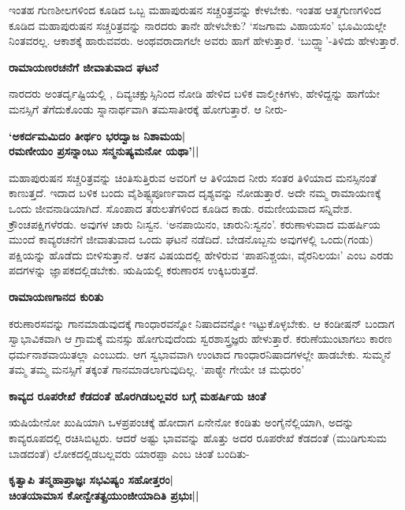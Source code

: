 ಇಂತಹ ಗುಣಶೀಲಗಳಿಂದ ಕೂಡಿದ ಒಬ್ಬ ಮಹಾಪುರುಷನ ಸಚ್ಚರಿತ್ರವನ್ನು ಕೇಳಬೇಕು. ಇಂತಹ ಆತ್ಮಗುಣಗಳಿಂದ ಕೂಡಿದ ಮಹಾಪುರುಷನ ಸಚ್ಚರಿತ್ರವನ್ನು ನಾರದರು ತಾನೇ ಹೇಳಬೇಕು? `ಸಜಗಾಮ ವಿಹಾಯಸಂ' ಭೂಮಿಯಲ್ಲೇ ನಿಂತವರಲ್ಲ. ಆಕಾಶಕ್ಕೆ ಹಾರುವವರು. ಅಂಥವರಾದಾಗಲೇ ಅವರು ಹಾಗೆ ಹೇಳುತ್ತಾರೆ. `ಬುದ್ದ್ವಾ'-ತಿಳಿದು ಹೇಳುತ್ತಾರೆ. 


{\bf ರಾಮಾಯಣರಚನೆಗೆ ಜೀವಾತುವಾದ ಘಟನೆ} 


ನಾರದರು ಅಂತರ್ದೃಷ್ಟಿಯಲ್ಲಿ , ದಿವ್ಯಚಕ್ಷುಸ್ಸಿನಿಂದ ನೋಡಿ ಹೇಳಿದ ಬಳಿಕ ವಾಲ್ಮೀಕಿಗಳು, ಹೇಳಿದ್ದನ್ನು ಹಾಗೆಯೇ ಮನಸ್ಸಿಗೆ ತೆಗೆದುಕೊಂಡು ಸ್ನಾನಾರ್ಥವಾಗಿ ತಮಸಾತೀರಕ್ಕೆ ಹೋಗುತ್ತಾರೆ. ಆ ನೀರು- 


\begin{center} 

{\bf `ಅಕರ್ದಮಮಿದಂ ತೀರ್ಥಂ ಭರದ್ವಾಜ ನಿಶಾಮಯ|\\ 

ರಮಣೀಯಂ ಪ್ರಸನ್ನಾಂಬು ಸನ್ಮನುಷ್ಯಮನೋ ಯಥಾ'||} 

\end{center} 


ಮಹಾಪುರುಷನ ಸಚ್ಚರಿತ್ರವನ್ನು ಚಿಂತಿಸುತ್ತಿರುವ ಅವರಿಗೆ ಆ ತಿಳಿಯಾದ ನೀರು ಸಂತರ ತಿಳಿಯಾದ ಮನಸ್ಸಿನಂತೆ ಕಾಣುತ್ತದೆ. ಇದಾದ ಬಳಿಕ ಬಂದು ವೈಶಿಷ್ಟ್ಯಪೂರ್ಣವಾದ ದೃಶ್ಯವನ್ನು ನೋಡುತ್ತಾರೆ. ಅದೇ ನಮ್ಮ ರಾಮಾಯಣಕ್ಕೆ ಒಂದು ಜೀವನಾಡಿಯಾಗಿದೆ. ಸೊಂಪಾದ ತರುಲತೆಗಳಿಂದ ಕೂಡಿದ ಕಾಡು. ರಮಣೀಯವಾದ ಸನ್ನಿವೇಶ. ಕ್ರೌಂಚಪಕ್ಷಿಗಳೆರಡು. ಅವುಗಳ ಚಾರು ನಿಃಸ್ವನ. `ಅನಪಾಯಿನಂ, ಚಾರುನಿ:ಸ್ವನಂ'. ಕರುಣಾಳುವಾದ ಮಹರ್ಷಿಯ ಮುಂದೆ ಕಾವ್ಯರಚನೆಗೆ ಜೀವಾತುವಾದ ಒಂದು ಘಟನೆ ನಡೆದಿದೆ. ಬೇಡನೊಬ್ಬನು ಅವುಗಳಲ್ಲಿ ಒಂದು(ಗಂಡು) ಪಕ್ಷಿಯನ್ನು ಹೊಡೆದು ಬೀಳಿಸುತ್ತಾನೆ. ಆತನ ವಿಷಯದಲ್ಲಿ ಹೇಳಿರುವ `ಪಾಪನಿಶ್ಚಯಃ, ವೈರನಿಲಯಃ' ಎಂಬ ಎರಡು ಪದಗಳನ್ನು ಜ್ಞಾಪಕದಲ್ಲಿಡಬೇಕು. ಋಷಿಯಲ್ಲಿ ಕರುಣಾರಸ ಉಕ್ಕಿಬರುತ್ತದೆ. 


{\bf ರಾಮಾಯಣಗಾನದ ಕುರಿತು} 


ಕರುಣಾರಸವನ್ನು ಗಾನಮಾಡುವುದಕ್ಕೆ ಗಾಂಧಾರವನ್ನೋ ನಿಷಾದವನ್ನೋ ಇಟ್ಟುಕೊಳ್ಳಬೇಕು. ಆ ಕಂಡೀಷನ್‍ ಬಂದಾಗ ಸ್ವಾಭಾವಿಕವಾಗಿ ಆ ಗ್ರಾಮಕ್ಕೆ ಮನಸ್ಸು ಹೋಗುವುದೆಂದು ಸ್ವರಶಾಸ್ತ್ರಜ್ಞರು ಹೇಳುತ್ತಾರೆ. ಕರುಣೆಯುಂಟಾಗಲು ಕಾರಣ ಧರ್ಮನಾಶವಾಯಿತಲ್ಲಾ ಎಂಬುದು. ಆಗ ಸ್ವಭಾವವಾಗಿ ಉಂಟಾದ ಗಾಂಧಾರನಿಷಾದಗಳಲ್ಲೇ ಹಾಡಬೇಕು. ಸುಮ್ಮನೆ ತಮ್ಮ ತಮ್ಮ ಮನಸ್ಸಿಗೆ ತಕ್ಕಂತೆ ಗಾನಮಾಡಲಾಗುವುದಿಲ್ಲ. `ಪಾಠ್ಯೇ ಗೇಯೇ ಚ ಮಧುರಂ' 


{\bf ಕಾವ್ಯದ ರೂಪರೇಖೆ ಕೆಡದಂತೆ ಹೊರಗಿಡಬಲ್ಲವರ ಬಗ್ಗೆ ಮಹರ್ಷಿಯ ಚಿಂತೆ} 


ಋಷಿಯೇನೋ ಖುಷಿಯಾಗಿ ಒಳಪ್ರಪಂಚಕ್ಕೆ ಹೋದಾಗ ಏನೇನೋ ಕಂಡಿತು ಅಂಗೈನೆಲ್ಲಿಯಾಗಿ, ಅದನ್ನು ಕಾವ್ಯರೂಪದಲ್ಲಿ ರಚಿಸಿಬಿಟ್ಟರು. ಆದರೆ ಅಷ್ಟು ಭಾವವನ್ನು ಹೊತ್ತು ಅದರ ರೂಪರೇಖೆ ಕೆಡದಂತೆ (ಮುಡಿಗುಸುಮ ಬಾಡದಂತೆ) ಲೋಕದಲ್ಲಿಡಬಲ್ಲವರು ಯಾರಪ್ಪಾ ಎಂಬ ಚಿಂತೆ ಬಂದಿತು- 


\begin{center} 

{\bf ಕೃತ್ವಾಪಿ ತನ್ಮಹಾಪ್ರಾಜ್ಞಃ ಸಭವಿಷ್ಯಂ ಸಹೋತ್ತರಂ|\\ 

ಚಿಂತಯಾಮಾಸ ಕೋನ್ವೇತತ್ಪ್ರಯುಂಜೀಯಾದಿತಿ ಪ್ರಭುಃ||} 

\end{center} 


